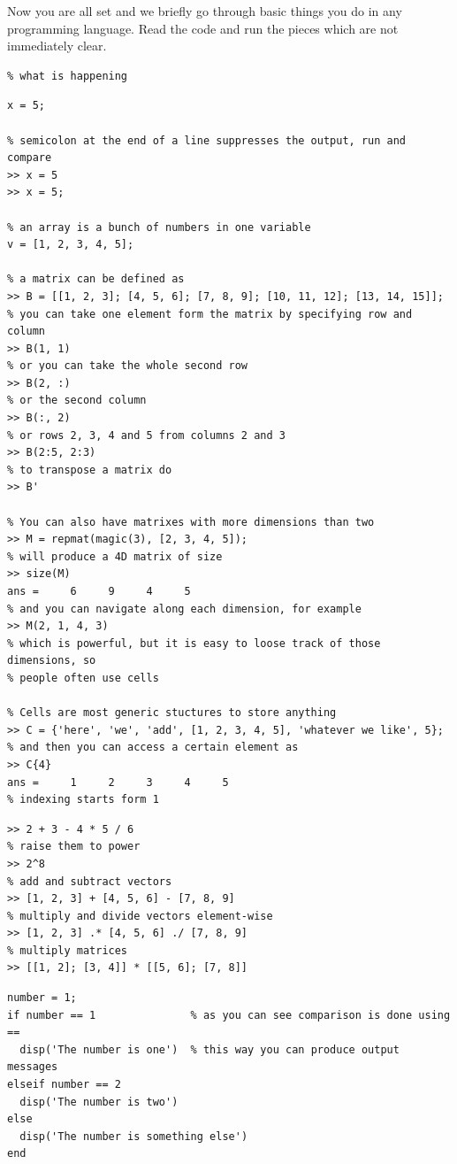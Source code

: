 \documentclass[a4paper,11pt]{article}
\begin{document}
Now you are all set and we briefly go through basic things you do in any programming language. Read the code and run the pieces which are not immediately clear.


%
%
\begin{lstlisting}[caption = {Comments}]
% This is a comment, write comments to explain tricky parts of code and outline
% what is happening
\end{lstlisting}

\begin{lstlisting}[caption = {Variables}]
% variable can hold any kind of data, you do not need to specify the type
x = 5;

% semicolon at the end of a line suppresses the output, run and compare
>> x = 5
>> x = 5;

% an array is a bunch of numbers in one variable
v = [1, 2, 3, 4, 5];

% a matrix can be defined as
>> B = [[1, 2, 3]; [4, 5, 6]; [7, 8, 9]; [10, 11, 12]; [13, 14, 15]];
% you can take one element form the matrix by specifying row and column
>> B(1, 1)
% or you can take the whole second row
>> B(2, :)
% or the second column
>> B(:, 2)
% or rows 2, 3, 4 and 5 from columns 2 and 3
>> B(2:5, 2:3)
% to transpose a matrix do
>> B'

% You can also have matrixes with more dimensions than two
>> M = repmat(magic(3), [2, 3, 4, 5]);
% will produce a 4D matrix of size
>> size(M)
ans =     6     9     4     5
% and you can navigate along each dimension, for example
>> M(2, 1, 4, 3)
% which is powerful, but it is easy to loose track of those dimensions, so
% people often use cells

% Cells are most generic stuctures to store anything
>> C = {'here', 'we', 'add', [1, 2, 3, 4, 5], 'whatever we like', 5};
% and then you can access a certain element as 
>> C{4}
ans =     1     2     3     4     5
% indexing starts form 1
\end{lstlisting}

\begin{lstlisting}[caption = {Arithmetics}]
% You can add, subtract, multiply, divide numbers
>> 2 + 3 - 4 * 5 / 6
% raise them to power
>> 2^8
% add and subtract vectors
>> [1, 2, 3] + [4, 5, 6] - [7, 8, 9]
% multiply and divide vectors element-wise
>> [1, 2, 3] .* [4, 5, 6] ./ [7, 8, 9]
% multiply matrices
>> [[1, 2]; [3, 4]] * [[5, 6]; [7, 8]]
\end{lstlisting}

\begin{lstlisting}[caption = {\texttt{IF - THEN - ELSE}}]
number = 1;
if number == 1               % as you can see comparison is done using ==
  disp('The number is one')  % this way you can produce output messages
elseif number == 2
  disp('The number is two')
else
  disp('The number is something else')
end
\end{lstlisting}
\end{document}
